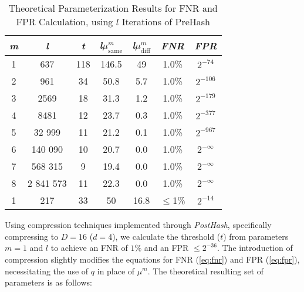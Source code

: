 \begin{table}[htbp] 
    \centering
    \begin{tabular}{|c|c|c|c|c|c|c|}
        \hline
        \textit{m} & \textit{l} & \textit{t} & \textit{l}\(\mu_{\text{same}}^m\) & \textit{l}\(\mu_{\text{diff}}^m\) & \textit{FNR} & \textit{FPR} \\
        \hline
        1 & 637 & 118 & 146.5 & 49 & 1.0\% & \(2^{-74}\) \\
        2 & 961 & 34 & 50.8 & 5.7 & 1.0\% & \(2^{-106}\) \\
        3 & 2569 & 18 & 31.3 & 1.2 & 1.0\% &\(2^{-179}\) \\
        4 & 8481 & 12 & 23.7 & 0.3 & 1.0\% & \(2^{-377}\) \\
        5 & 32 999 & 11 & 21.2 & 0.1 & 1.0\% & \(2^{-967}\) \\
        6 & 140 090 & 10 & 20.7 & 0.0 & 1.0\% & \(2^{-\infty}\) \\
        7 & 568 315 & 9 & 19.4 & 0.0 & 1.0\% & \(2^{-\infty}\) \\
        8 & 2 841 573 & 11 & 22.3 & 0.0 & 1.0\% & \(2^{-\infty}\) \\
        1 & 217 & 33 & 50 & 16.8 & \(\leq\)1\% & \(2^{-14}\)\\
        \hline
    \end{tabular}
    \caption{Theoretical Parameterization Results for FNR and FPR Calculation, using $l$ Iterations of PreHash}
    \label{tab:theoretical_parameterization_PreHash}
\end{table}

Using compression techniques implemented through \textit{PostHash}, specifically compressing to \( D = 16 \) (\( d = 4 \)), we calculate the threshold (\( t \)) from parameters \( m = 1 \) and \( l \) to achieve an FNR of \(1\%\) and an FPR \(\leq 2^{-36} \). The introduction of compression slightly modifies the equations for FNR (\ref{eq:fnr}) and FPR (\ref{eq:fpr}), necessitating the use of \( q \) in place of \(\mu^m\). The theoretical resulting set of parameters is as follows:

